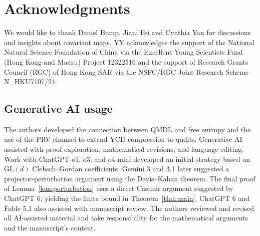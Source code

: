 \documentclass[a4paper,onecolumn,11pt]{quantumarticle}
\begin{document}
\section*{Acknowledgments}
    We would like to thank Daniel Bump, Jiani Fei and Cynthia Yan for discussions and insights about covariant maps.
    YY acknowledges the support of the National Natural Science Foundation of China via the Excellent Young Scientists Fund (Hong Kong and Macau) Project 12322516 and the support of Research Grants Council (RGC) of Hong Kong SAR via the NSFC/RGC Joint Research Scheme N\_HKU7107/24.
    
\subsection*{Generative AI usage}

The authors developed the connection between QMDL and free entropy
and the use of the PRV channel to extend YCH compression to qudits.
Generative AI assisted with proof exploration, mathematical revisions,
and language editing. Work with ChatGPT-o1, o3, and o4-mini developed
an initial strategy based on $\mathrm{GL}(d)$ Clebsch--Gordan
coefficients. Gemini 3 and 3.1 later suggested a projector-perturbation
argument using the Davis--Kahan theorem. The final proof of
Lemma~\ref{lem:perturbation} uses a direct Casimir argument suggested
by ChatGPT 6, yielding the finite bound in Theorem~\ref{thm:main}.
ChatGPT 6 and Fable 5.1 also assisted with manuscript review.
The authors reviewed and revised all AI-assisted material and take
responsibility for the mathematical arguments and the manuscript's content.


\appendix
\end{document}
